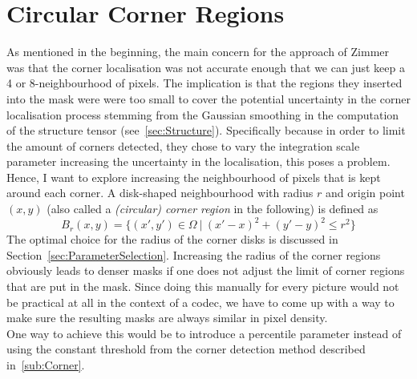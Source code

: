 \section{Circular Corner Regions}\label{sec:Contribution}
As mentioned in the beginning, the main concern for the approach of Zimmer~\cite{zimmer07} was that the 
corner localisation was not accurate enough that we can just keep a 4 or 8-neighbourhood 
of pixels. The implication is that the regions they inserted into the mask were were too small to
cover the potential uncertainty in the corner localisation process stemming from the Gaussian
smoothing in the computation of the structure tensor (see~\ref{sec:Structure}). Specifically
because in order to limit the amount of corners detected, they chose to vary the integration scale
parameter increasing the uncertainty in the localisation, this poses a problem.\newpage\noindent
Hence, I want to explore increasing the neighbourhood of pixels that is kept around each
corner. A disk-shaped neighbourhood with radius $r$ and origin point $(x, y)$ (also called a
\textit{(circular) corner region} in the following) is defined as 
\begin{equation}
    B_r(x, y) = \lbrace (x',y') \in \Omega\ \vert\ {(x'-x)}^2 + {(y'-y)}^2 \leq r^2\rbrace
\end{equation}
The optimal choice for the radius of the corner disks is discussed in
Section~\ref{sec:ParameterSelection}.
Increasing the radius of the corner regions obviously leads to denser masks if one does not adjust
the limit of corner regions that are put in the mask. Since doing this manually for every picture
would not be practical at all in the context of a codec, we have to come up with a way to make sure
the resulting masks are always similar in pixel density.\\
One way to achieve this would be to introduce a percentile parameter instead of using the constant
threshold from the corner detection method described in~\ref{sub:Corner}.

